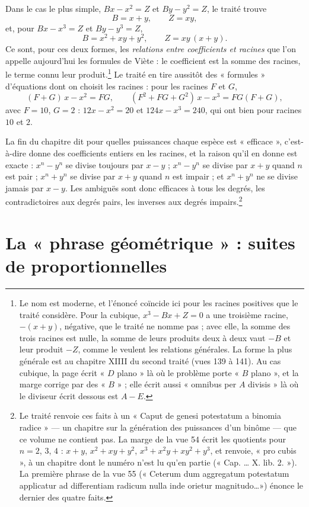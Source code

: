 \documentclass[11pt,a4paper]{article}
\begin{document}
Dans le cas le plus simple, $Bx - x^2 = Z$ et $By - y^2 = Z$, le traité trouve
\[ B = x + y, \qquad Z = xy , \]
et, pour $Bx - x^3 = Z$ et $By - y^3 = Z$,
\[ B = x^2 + xy + y^2, \qquad Z = xy\,(x + y) . \]
Ce sont, pour ces deux formes, les \emph{relations entre coefficients et racines}
que l'on appelle aujourd'hui les formules de Viète : le coefficient est la somme
des racines, le terme connu leur produit.\footnote{Le nom est moderne, et
l'énoncé coïncide ici pour les racines positives que le traité considère. Pour
la cubique, $x^3 - Bx + Z = 0$ a une troisième racine, $-(x + y)$, négative, que
le traité ne nomme pas ; avec elle, la somme des trois racines est nulle, la
somme de leurs produits deux à deux vaut $-B$ et leur produit $-Z$, comme le
veulent les relations générales. La forme la plus générale est au chapitre
XIIII du second traité (vues 139 à 141). Au cas cubique, la page écrit « $D$
plano » là où le problème porte « $B$ plano », et la marge corrige par des
« $B$ » ; elle écrit aussi « omnibus per $A$ divisis » là où le diviseur écrit
dessous est $A - E$.} Le traité en tire aussitôt des « formules » d'équations
dont on choisit les racines : pour les racines $F$ et $G$,
\[ (F + G)\,x - x^2 = FG , \qquad (F^2 + FG + G^2)\,x - x^3 = FG(F + G) , \]
avec $F = 10$, $G = 2$ : $12x - x^2 = 20$ et $124x - x^3 = 240$, qui ont bien
pour racines $10$ et $2$.

La fin du chapitre dit pour quelles puissances chaque espèce est
« efficace », c'est-à-dire donne des coefficients entiers en les racines, et la
raison qu'il en donne est exacte : $x^n - y^n$ se divise toujours par $x - y$ ;
$x^n - y^n$ se divise par $x + y$ quand $n$ est pair ; $x^n + y^n$ se divise
par $x + y$ quand $n$ est impair ; et $x^n + y^n$ ne se divise jamais par
$x - y$. Les ambiguës sont donc efficaces à tous les degrés, les contradictoires
aux degrés pairs, les inverses aux degrés impairs.\footnote{Le traité renvoie ces
faits à un « Caput de genesi potestatum a binomia radice » — un chapitre sur la
génération des puissances d'un binôme — que ce volume ne contient pas. La
marge de la vue 54 écrit les quotients pour $n = 2$, $3$, $4$ : $x + y$,
$x^2 + xy + y^2$, $x^3 + x^2y + xy^2 + y^3$, et renvoie, « pro cubis », à un
chapitre dont le numéro n'est lu qu'en partie (« Cap. \ldots{} X. lib. 2. »). La
première phrase de la vue 55 (« Ceterum dum aggregatum potestatum applicatur ad
differentiam radicum nulla inde orietur magnitudo\ldots ») énonce le dernier des
quatre faits.}

\section*{La « phrase géométrique » : suites de proportionnelles}
\end{document}
